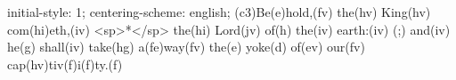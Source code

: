 initial-style: 1;
centering-scheme: english;
(c3)Be(e)hold,(fv) the(hv) King(hv) com(hi)eth,(iv) <sp>*</sp> the(hi) Lord(jv) of(h) the(iv) earth:(iv) (;) and(iv) he(g) shall(iv) take(hg) a(fe)way(fv) the(e) yoke(d) of(ev) our(fv) cap(hv)tiv(f)i(f)ty.(f)
